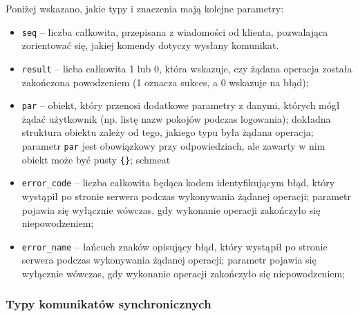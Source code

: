 Poniżej wskazano, jakie typy i znaczenia mają kolejne parametry:
\begin{itemize}
	\item \texttt{seq} -- liczba całkowita, przepisana z wiadomości od klienta,
	pozwalająca zorientować się, jakiej komendy dotyczy wysłany komunikat.

	\item \texttt{result} -- licba całkowita 1 lub 0, która wskazuje, czy żądana
	operacja została zakończona powodzeniem (1 oznacza sukces, a 0 wskazuje na
	błąd);

	\item \texttt{par} -- obiekt, który przenosi dodatkowe parametry z danymi,
	których mógł żądać użytkownik (np. listę nazw pokojów podczas logowania);
	dokładna struktura obiektu zależy od tego, jakiego typu była żądana
	operacja; parametr \texttt{par} jest obowiązkowy przy odpowiedziach, ale
	zawarty w nim obiekt może być pusty \texttt{\{\}}; schmeat

	\item \texttt{error\_code} -- liczba całkowita będąca kodem identyfikującym błąd, który wystąpił po stronie serwera podczas wykonywania żądanej operacji; parametr pojawia się wyłącznie wówczas, gdy wykonanie operacji zakończyło się niepowodzeniem;

	\item \texttt{error\_name} -- łańcuch znaków opisujący błąd, który wystąpił
	po stronie serwera podczas wykonywania żądanej operacji; parametr pojawia
	się wyłącznie wówczas, gdy wykonanie operacji zakończyło się niepowodzeniem;

\end{itemize}

\subsubsection{Typy komunikatów synchronicznych}

\leavevmode\hbox{}

